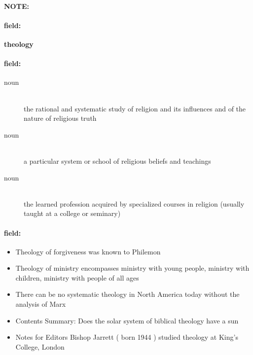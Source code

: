 \documentclass[12pt]{article}
\newenvironment{note}{\paragraph{NOTE:}}{}
\newenvironment{field}{\paragraph{field:}}{}
\begin{document}
\begin{note}
\begin{field}
\textbf{\large theology}
\end{field}


\begin{field}
\begin{description}
\item[noun] \hfill \\ 
the rational and systematic study of religion and its influences and of the nature of religious truth

\item[noun] \hfill \\ 
a particular system or school of religious beliefs and teachings

\item[noun] \hfill \\ 
the learned profession acquired by specialized courses in religion (usually taught at a college or seminary)

\end{description}
\end{field}

\begin{field}
\begin{itemize}
\item Theology of forgiveness was known to Philemon
\item Theology of ministry encompasses ministry with young people, ministry with children, ministry with people of all ages
\item There can be no systematic theology in North America today without the analysis of Marx
\item Contents Summary: Does the solar system of biblical theology have a sun
\item Notes for Editors Bishop Jarrett ( born 1944 ) studied theology at King's College, London
\end{itemize}
\end{field}
\end{note}
\end{document}
